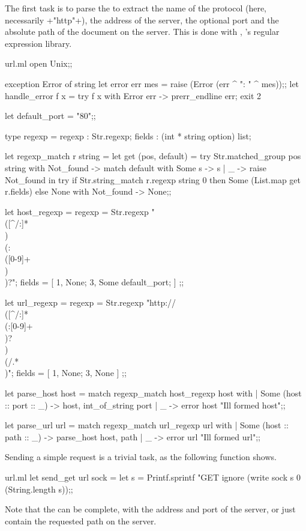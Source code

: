 The first task is to parse the {\URL} to extract the name of the
protocol (here, necessarily \ml+"http"+), the address of the server,
the optional port and the absolute path of the document on the
server. This is done with , {\ocaml}'s regular
expression library.
%
\begin{listingcodefile}{url.ml}
open Unix;;

exception Error of string
let error err mes = raise (Error (err ^ ": " ^ mes));;
let handle_error f x = try f x with Error err -> prerr_endline err; exit 2

let default_port = "80";;

type regexp = { regexp : Str.regexp; fields : (int * string option) list; }

let regexp_match r string =
  let get (pos, default) =
    try Str.matched_group pos string
    with Not_found ->
      match default with Some s -> s | _ -> raise Not_found in
  try
    if Str.string_match r.regexp string 0 then
      Some (List.map get r.fields)
    else None
  with Not_found -> None;;

let host_regexp =
  { regexp = Str.regexp "\\([^/:]*\\)\\(:\\([0-9]+\\)\\)?";
    fields = [ 1, None; 3, Some default_port; ] };;

let url_regexp =
  { regexp = Str.regexp "http://\\([^/:]*\\(:[0-9]+\\)?\\)\\(/.*\\)";
    fields = [ 1, None; 3, None ] };;

let parse_host host = match regexp_match host_regexp host with
  | Some (host :: port :: _) -> host, int_of_string port
  | _ -> error host "Ill formed host";;

let parse_url url = match regexp_match url_regexp url with
  | Some (host :: path :: _) -> parse_host host, path
  | _ -> error url "Ill formed url";;
\end{listingcodefile}
% 
Sending a simple request is a trivial task, as the following function
shows.
%
\begin{listingcodefile}{url.ml}
let send_get url sock =
  let s = Printf.sprintf "GET %
  ignore (write sock s 0 (String.length s));;
\end{listingcodefile}
% 
Note that the {\URL} can be complete, with the address and port of the
server, or just contain the requested path on the server.

